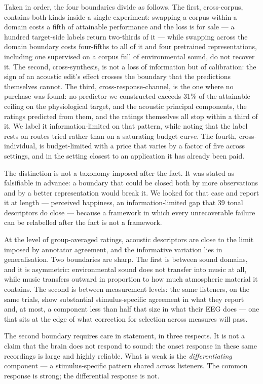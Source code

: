 Taken in order, the four boundaries divide as follows. The first, cross-corpus,
contains both kinds inside a single experiment: swapping a corpus within a domain
costs a fifth of attainable performance and the loss is for sale --- a hundred
target-side labels return two-thirds of it --- while swapping across the domain
boundary costs four-fifths to all of it and four pretrained representations,
including one supervised on a corpus full of environmental sound, do not recover
it. The second, cross-synthesis, is not a loss of information but of calibration:
the sign of an acoustic edit's effect crosses the boundary that the predictions
themselves cannot. The third, cross-response-channel, is the one where no purchase
was found: no predictor we constructed exceeds 31\% of the attainable ceiling on
the physiological target, and the acoustic principal components, the ratings
predicted from them, and the ratings themselves all stop within a third of it. We
label it information-limited on that pattern, while noting that the label rests on
routes tried rather than on a saturating budget curve. The fourth,
cross-individual, is budget-limited with a price that varies by a factor of five
across settings, and in the setting closest to an application it has already been
paid.

The distinction is not a taxonomy imposed after the fact. It was stated as
falsifiable in advance: a boundary that could be closed both by more observations
and by a better representation would break it. We looked for that case and report
it at length --- perceived happiness, an information-limited gap that 39 tonal
descriptors do close --- because a framework in which every unrecoverable failure
can be relabelled after the fact is not a framework.

At the level of group-averaged ratings, acoustic descriptors are close to the limit
imposed by annotator agreement, and the informative variation lies in
generalisation. Two boundaries are sharp. The first is between sound domains, and
it is asymmetric: environmental sound does not transfer into music at all, while
music transfers outward in proportion to how much atmospheric material it contains.
The second is between measurement levels: the same listeners, on the same trials,
show substantial stimulus-specific agreement in what they report and, at most, a
component less than half that size in what their EEG does --- one that sits at the
edge of what correction for selection across measures will pass.

The second boundary requires care in statement, in three respects. It is not a claim
that the brain does not respond to sound: the onset response in these same
recordings is large and highly reliable. What is weak is the
\emph{differentiating} component --- a stimulus-specific pattern shared across
listeners. The common response is strong; the differential response is not.

